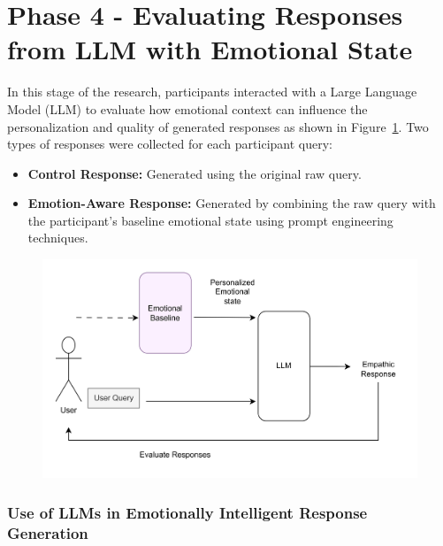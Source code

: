 \section{Phase 4 - Evaluating Responses from LLM with Emotional State}
\label{sec:phase4-llm-responses}

\par In this stage of the research, participants interacted with a Large Language Model (LLM) to evaluate how emotional context can influence the personalization and quality of generated responses as shown in Figure~\ref{fig:phase4}. Two types of responses were collected for each participant query:
\begin{itemize}
    \item \textbf{Control Response:} Generated using the original raw query.
    \item \textbf{Emotion-Aware Response:} Generated by combining the raw query with the participant’s baseline emotional state using prompt engineering techniques.
\end{itemize}

\begin{figure}[h]
    \centering
    \includegraphics[width=1\textwidth]{img/chapter_03/Phase4.jpg}
    \label{fig:phase4}
\end{figure}

\subsubsection*{Use of LLMs in Emotionally Intelligent Response Generation}

